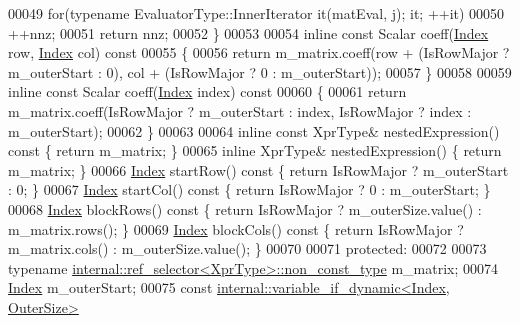 \begin{DoxyCode}
00049         \textcolor{keywordflow}{for}(\textcolor{keyword}{typename} EvaluatorType::InnerIterator it(matEval, j); it; ++it)
00050           ++nnz;
00051       \textcolor{keywordflow}{return} nnz;
00052     \}
00053 
00054     \textcolor{keyword}{inline} \textcolor{keyword}{const} Scalar coeff(\hyperlink{group___core___module_a554f30542cc2316add4b1ea0a492ff02}{Index} row, \hyperlink{group___core___module_a554f30542cc2316add4b1ea0a492ff02}{Index} col)\textcolor{keyword}{ const}
00055 \textcolor{keyword}{    }\{
00056       \textcolor{keywordflow}{return} m\_matrix.coeff(row + (IsRowMajor ? m\_outerStart : 0), col + (IsRowMajor ? 0 :  m\_outerStart));
00057     \}
00058 
00059     \textcolor{keyword}{inline} \textcolor{keyword}{const} Scalar coeff(\hyperlink{group___core___module_a554f30542cc2316add4b1ea0a492ff02}{Index} index)\textcolor{keyword}{ const}
00060 \textcolor{keyword}{    }\{
00061       \textcolor{keywordflow}{return} m\_matrix.coeff(IsRowMajor ? m\_outerStart : index, IsRowMajor ? index :  m\_outerStart);
00062     \}
00063 
00064     \textcolor{keyword}{inline} \textcolor{keyword}{const} XprType& nestedExpression()\textcolor{keyword}{ const }\{ \textcolor{keywordflow}{return} m\_matrix; \}
00065     \textcolor{keyword}{inline} XprType& nestedExpression() \{ \textcolor{keywordflow}{return} m\_matrix; \}
00066     \hyperlink{group___core___module_a554f30542cc2316add4b1ea0a492ff02}{Index} startRow()\textcolor{keyword}{ const }\{ \textcolor{keywordflow}{return} IsRowMajor ? m\_outerStart : 0; \}
00067     \hyperlink{group___core___module_a554f30542cc2316add4b1ea0a492ff02}{Index} startCol()\textcolor{keyword}{ const }\{ \textcolor{keywordflow}{return} IsRowMajor ? 0 : m\_outerStart; \}
00068     \hyperlink{group___core___module_a554f30542cc2316add4b1ea0a492ff02}{Index} blockRows()\textcolor{keyword}{ const }\{ \textcolor{keywordflow}{return} IsRowMajor ? m\_outerSize.value() : m\_matrix.rows(); \}
00069     \hyperlink{group___core___module_a554f30542cc2316add4b1ea0a492ff02}{Index} blockCols()\textcolor{keyword}{ const }\{ \textcolor{keywordflow}{return} IsRowMajor ? m\_matrix.cols() : m\_outerSize.value(); \}
00070 
00071   \textcolor{keyword}{protected}:
00072 
00073     \textcolor{keyword}{typename} \hyperlink{class_eigen_1_1internal_1_1_tensor_lazy_evaluator_writable}{internal::ref\_selector<XprType>::non\_const\_type}
       m\_matrix;
00074     \hyperlink{group___core___module_a554f30542cc2316add4b1ea0a492ff02}{Index} m\_outerStart;
00075     \textcolor{keyword}{const} \hyperlink{class_eigen_1_1internal_1_1variable__if__dynamic}{internal::variable\_if\_dynamic<Index, OuterSize>} 

\end{DoxyCode}
